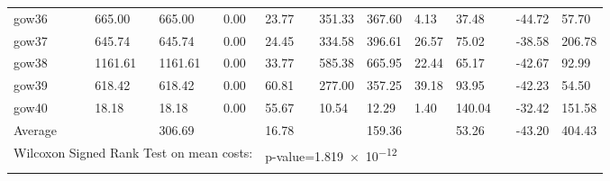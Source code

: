 \begin{table}[H]
\begin{tabularx}{\textwidth}{llXXXXlXXXXlXX}
    gow36 && 665.00 & 665.00 & 0.00 & 23.77 && 351.33 & 367.60 & 4.13 & 37.48 && -44.72 & 57.70\\
    gow37 && 645.74 & 645.74 & 0.00 & 24.45 && 334.58 & 396.61 & 26.57 & 75.02 && -38.58 & 206.78\\
    gow38 && 1161.61 & 1161.61 & 0.00 & 33.77 && 585.38 & 665.95 & 22.44 & 65.17 && -42.67 & 92.99\\
    gow39 && 618.42 & 618.42 & 0.00 & 60.81 && 277.00 & 357.25 & 39.18 & 93.95 && -42.23 & 54.50\\
    gow40 && 18.18 & 18.18 & 0.00 & 55.67 && 10.54 & 12.29 & 1.40 & 140.04 && -32.42 & 151.58\\
    \hline
    \multicolumn{1}{l}{Average} &&& 306.69 && 16.78 &&& 159.36 && 53.26 && -43.20 & 404.43\\
    \hline
    \multicolumn{5}{l}{Wilcoxon Signed Rank Test on mean costs:} & \multicolumn{9}{l}{p-value=\num{1.819e-12}}\\
        \lasthline
    \end{tabularx}
    \normalsize
\end{table}
